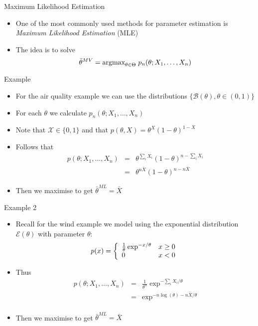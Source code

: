 \documentclass{beamer}
\begin{document}
\begin{frame}{Maximum Likelihood Estimation} 
\begin{itemize} 
 \item One of the most commonly used methods for parameter estimation is \emph{Maximum Likelihood Estimation} (MLE) 
 \item The idea is to solve 
 \begin{displaymath}
  \bar{\theta}^{MV} = \mbox{argmax}_{\theta \in \Theta} \; p_n(\theta; X_1, \ldots, X_n) 
 \end{displaymath}
\end{itemize}
\end{frame}

\begin{frame}{Example} 
\begin{itemize} 
 \item For the air quality example we can use the distributions $\{\mathcal{B}(\theta), \theta \in (0, 1)\}$ 
 \item For each $\theta$ we calculate $p_n(\theta; X_1, \ldots, X_n)$
 \item Note that $\mathcal{X} \in \{0, 1\}$ and that $p(\theta, X) = \theta^X(1-\theta)^{1-X}$  
 \item Follows that 
 \begin{eqnarray*} 
  p(\theta; X_1, \ldots, X_n) &=& \theta^{\sum_i X_i}(1-\theta)^{n-{\sum_i X_i}} \\ 
  &=& \theta^{n \bar{X}}(1-\theta)^{n-{n \bar{X}}} 
 \end{eqnarray*}
 \item Then we maximise to get $\bar{\theta}^{ML} = \bar{X}$ 
\end{itemize}
\end{frame}

\begin{frame}{Example 2} 
\begin{itemize} 
 \item Recall for the wind example we model using the exponential distribution $\mathcal{E}(\theta)$ with parameter $\theta$: 
  \begin{displaymath}
  p(x) = \left\{ \begin{array}{l l}\frac{1}{\theta}  \exp^{-x/\theta} & x \geq 0 \\ 0 & x < 0 \end{array} \right. 
 \end{displaymath}
 \item Thus
  \begin{eqnarray*} 
  p(\theta; X_1, \ldots, X_n) &=& \frac{1}{\theta^n}  \exp^{-\sum_i X_i/\theta} \\ 
  &=&  \exp^{-n\log(\theta) - n\bar{X}/\theta} \\ 
 \end{eqnarray*}
 \item Then we maximise to get $\bar{\theta}^{ML} = \bar{X}$ 
\end{itemize}
\end{frame}
\end{document}

